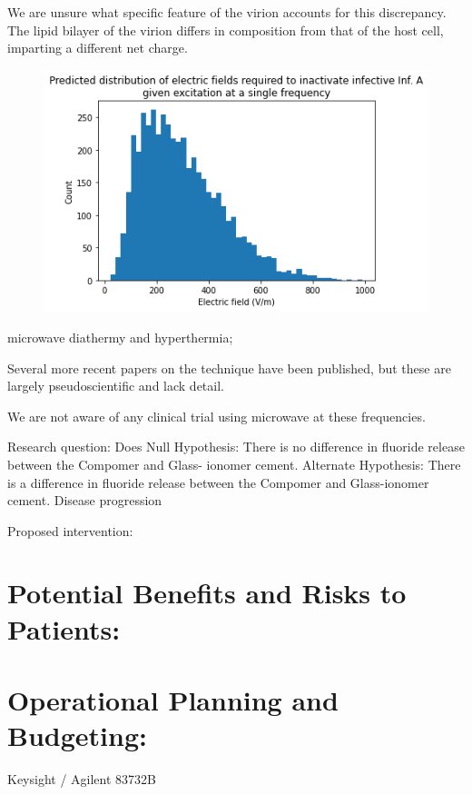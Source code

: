 \documentclass[fleqn,10pt]{paper}
\begin{document}
We are unsure what specific feature of the virion accounts for this discrepancy. The lipid bilayer of the virion differs in composition from that of the host cell, imparting a different net charge.


\begin{figure}[H]
	\centering
	\includegraphics[width=\textwidth]{biology/output_35_1.png}
\end{figure}


microwave diathermy and hyperthermia; 





Several more recent papers \cite{Theoretical2020} on the technique have been published, but these are largely pseudoscientific and lack detail. 

We are not aware of any clinical trial using microwave at these frequencies.





Research question: 
Does 
Null Hypothesis: There is no difference in fluoride release between the Compomer and Glass- ionomer cement.
Alternate Hypothesis: There is a difference in fluoride release between the Compomer and Glass-ionomer cement.
Disease progression

Proposed intervention:



\section{Potential Benefits and Risks to Patients:}

\section{Operational Planning and Budgeting:}



Keysight / Agilent 83732B
\end{document}
